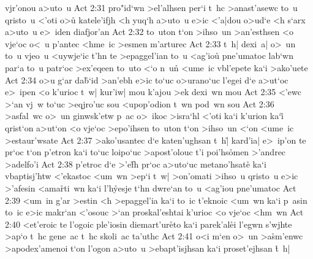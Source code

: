 vjr'onou
a>uto~u\bibvsend
\vs Act 2:31
pro"id`wn
>el'alhsen
per`i
t~hc
>anast'asewc
to~u
qristo~u
<'oti
o>u\r{}
katele'ifjh
<h
yuq`h
a>uto~u
e>ic
<'a|dou
o>ud`e
<h
s`arx
a>uto~u
e>~iden
diafjor'an\bibvsend
\vs Act 2:32
to~uton
t`on
>ihso~un
>an'esthsen
<o
vje`oc
o<~u
p'antec
<hme~ic
>esmen
m'arturec\bibvsend
\vs Act 2:33
t~h|
dexi~a|
o>~un
to~u
vjeo~u
<uywje`ic
t'hn
te
>epaggel'ian
to~u
<ag'iou\r{}
pne'umatoc
lab`wn
par`a
to~u
patr`oc
>ex'eqeen
to~uto
<`o
n~un\r{}
<ume~ic
vbl'epete
ka`i
>ako'uete\bibvsend
\vs Act 2:34
o>u
g`ar
da\r{b}`id
>an'ebh
e>ic
to`uc
o>urano`uc
l'egei
d`e
a>ut`oc
e>~ipen
<o
k'urioc
t~w|
kur'iw|
mou
k'ajou
>ek
dexi~wn
mou\bibvsend
\vs Act 2:35
<'ewc
>`an
vj~w
to`uc
>eqjro'uc
sou
<upop'odion
t~wn
pod~wn
sou\bibvsend
\vs Act 2:36
>asfal~wc
o>~un
ginwsk'etw
p~ac
o>~ikoc
>isra`hl
<'oti
ka`i
k'urion
ka`i\r{}
qrist`on
a>ut`on
<o
vje`oc
>epo'ihsen
to~uton
t`on
>ihso~un
<`on
<ume~ic
>estaur'wsate\bibvsend
\vs Act 2:37
>ako'usantec
d`e
katen'ughsan
t~h|\r{}
kard'ia|
e>~ip'on
te
pr`oc
t`on
p'etron
ka`i
to`uc
loipo`uc
>apost'olouc
t'i
poi'hs\r{o}men
>'andrec
>adelfo'i\bibvsend
\vs Act 2:38
p'etroc
d`e
>'e\r{f}h
pr`oc
a>uto`uc
metano'hsat\r{e}
ka`i
vbaptisj'htw
<'ekastoc
<um~wn
>ep`i
t~w|
>on'omati
>ihso~u
qristo~u
e>ic
>'afesin
<ama\r{r}ti~wn
ka`i
l'h\r{y}esje
t`hn
dwre`an
to~u
<ag'iou
pne'umatoc\bibvsend
\vs Act 2:39
<um~in
g'ar
>estin
<h
>epaggel'ia
ka`i
to~ic
t'eknoic
<um~wn
ka`i
p~asin
to~ic
e>ic
makr`an
<'osouc
>`an
proskal'eshtai
k'urioc
<o
vje`oc
<hm~wn\bibvsend
\vs Act 2:40
<et'eroic
te
l'ogoic
ple'iosin
diemart'ur\r{e}to
ka`i
parek'al\r{e}i
l'egwn
s'wjhte
>ap`o
t~hc
gene~ac
t~hc
skoli~ac
ta'uthc\bibvsend
\vs Act 2:41
o<i
m`en
o>~un
>a\r{s}m'enwc
>apodex'amenoi
t`on
l'ogon
a>uto~u
>ebapt'isjhsan
ka`i
proset'ejhsan
\r{t}~h|

